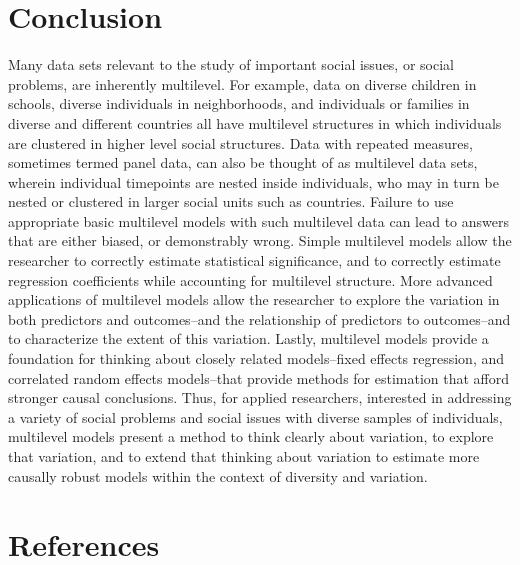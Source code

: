 \documentclass[
  letterpaper,
  DIV=11,
  numbers=noendperiod]{scrreprt}
\begin{document}
\hypertarget{conclusion}{%
\chapter{Conclusion}\label{conclusion}}

Many data sets relevant to the study of important social issues, or
social problems, are inherently multilevel. For example, data on diverse
children in schools, diverse individuals in neighborhoods, and
individuals or families in diverse and different countries all have
multilevel structures in which individuals are clustered in higher level
social structures. Data with repeated measures, sometimes termed panel
data, can also be thought of as multilevel data sets, wherein individual
timepoints are nested inside individuals, who may in turn be nested or
clustered in larger social units such as countries. Failure to use
appropriate basic multilevel models with such multilevel data can lead
to answers that are either biased, or demonstrably wrong. Simple
multilevel models allow the researcher to correctly estimate statistical
significance, and to correctly estimate regression coefficients while
accounting for multilevel structure. More advanced applications of
multilevel models allow the researcher to explore the variation in both
predictors and outcomes--and the relationship of predictors to
outcomes--and to characterize the extent of this variation. Lastly,
multilevel models provide a foundation for thinking about closely
related models--fixed effects regression, and correlated random effects
models--that provide methods for estimation that afford stronger causal
conclusions. Thus, for applied researchers, interested in addressing a
variety of social problems and social issues with diverse samples of
individuals, multilevel models present a method to think clearly about
variation, to explore that variation, and to extend that thinking about
variation to estimate more causally robust models within the context of
diversity and variation.


\hypertarget{references}{%
\chapter*{References}\label{references}}
\end{document}
